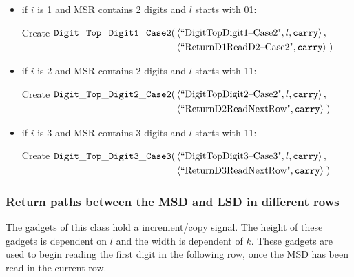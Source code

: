 \begin{itemize}
\begin{itemize}
                \item if $i$ is 1 and MSR contains 2 digits and $l$ starts with 01:

                Create
                $\begin{aligned}[t]
                    {\tt Digit\_Top\_Digit1\_Case2}(& \left \langle \text{``DigitTopDigit1--Case2"}, l, {\tt carry} \right\rangle, & \\
                                     & \left \langle \text{``ReturnD1ReadD2--Case2"},    {\tt carry} \right\rangle \;)
                \end{aligned}$
                \vspace{.5cm}


                \item if $i$ is 2 and MSR contains 2 digits and $l$ starts with 11:

                Create
                $\begin{aligned}[t]
                    {\tt Digit\_Top\_Digit2\_Case2}(& \left \langle \text{``DigitTopDigit2--Case2"}, l, {\tt carry} \right\rangle, & \\
                                     & \left \langle \text{``ReturnD2ReadNextRow"},     {\tt carry} \right\rangle \;)
                \end{aligned}$
                \vspace{.5cm}


                \item if $i$ is 3 and MSR contains 3 digits and $l$ starts with 11:

                Create
                $\begin{aligned}[t]
                    {\tt Digit\_Top\_Digit3\_Case3}(& \left \langle \text{``DigitTopDigit3--Case3"}, l, {\tt carry} \right\rangle, & \\
                                         & \left \langle \text{``ReturnD3ReadNextRow"},     {\tt carry} \right\rangle \;)
                \end{aligned}$
                \vspace{.5cm}


            \end{itemize}

        \end{itemize}
    \vspace{1cm}



    \subsubsection{Return paths between the MSD and LSD in different rows}
        The gadgets of this class hold a increment/copy signal.
        The height of these gadgets is dependent on $l$ and the width is dependent of $k$.
        These gadgets are used to begin reading the first digit in the following row, once
        the MSD has been read in the current row.
        \vspace{1cm}

